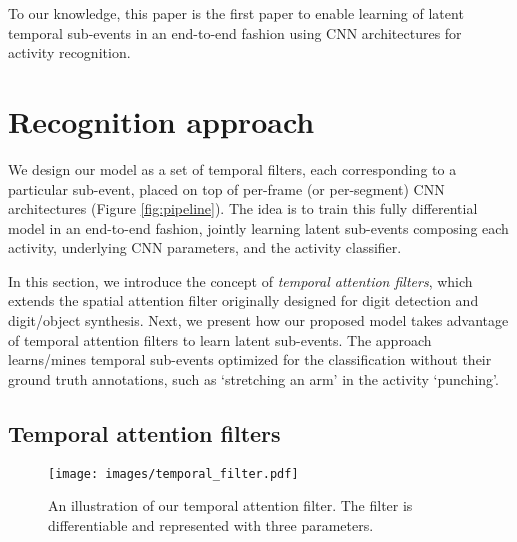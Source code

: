 \documentclass[letterpaper]{article}
\begin{document}
To our knowledge, this paper is the first paper to enable learning of latent temporal sub-events in an end-to-end fashion using CNN architectures for activity recognition.













\section{Recognition approach}
\label{sec:approach}

We design our model as a set of temporal filters, each corresponding to a particular sub-event, placed on top of per-frame (or per-segment) CNN architectures (Figure \ref{fig:pipeline}). The idea is to train this fully differential model in an end-to-end fashion, jointly learning latent sub-events composing each activity, underlying CNN parameters, and the activity classifier.

In this section, we introduce the concept of \emph{temporal attention filters}, which extends the spatial attention filter \cite{attention15} originally designed for digit detection and digit/object synthesis. Next, we present how our proposed model takes advantage of temporal attention filters to learn latent sub-events. The approach learns/mines temporal sub-events optimized for the classification without their ground truth annotations, such as `stretching an arm' in the activity `punching'.

\subsection{Temporal attention filters}

\begin{figure}[b]
\begin{center}
   \texttt{[image: images/temporal\_filter.pdf]}
\end{center}
   \caption{An illustration of our temporal attention filter. The filter is differentiable and represented with three parameters.}
\label{fig:filter}		
\end{figure}
\end{document}

